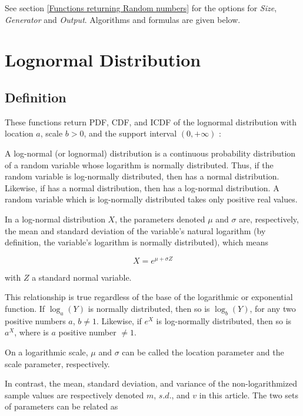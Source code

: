 \vspace{0.3cm}

See section \ref{Functions returning Random numbers} for the options for  {\itshape\sffamily Size},  {\itshape\sffamily Generator} and {\itshape\sffamily Output}. Algorithms and formulas are given below.




\section{Lognormal Distribution}
\label{LognormalDistribution}


\subsection{Definition}
\label{LognormalDistributionDefinition}


These functions return PDF, CDF, and ICDF of the lognormal distribution with location
$a$, scale $b > 0$, and the support interval $(0,+\infty)$ :


A log-normal (or lognormal) distribution is a continuous probability distribution of a random variable whose logarithm is normally distributed. Thus, if the random variable  is log-normally distributed, then  has a normal distribution. Likewise, if  has a normal distribution, then  has a log-normal distribution. A random variable which is log-normally distributed takes only positive real values.

In a log-normal distribution $X$, the parameters denoted $\mu$ and $\sigma$ are, respectively, the mean and standard deviation of the variable's natural logarithm (by definition, the variable's logarithm is normally distributed), which means

\begin{equation}
	X = e^{\mu+\sigma Z}
\end{equation}

with $Z$ a standard normal variable.

This relationship is true regardless of the base of the logarithmic or exponential function. If $\log_a(Y)$ is normally distributed, then so is $\log_b(Y)$, for any two positive numbers $a$, $b \neq 1$. Likewise, if $e^X$ is log-normally distributed, then so is $a^X$, where  is $a$ positive number $\neq 1$.

On a logarithmic scale, $\mu$ and $\sigma$ can be called the location parameter and the scale parameter, respectively.

In contrast, the mean, standard deviation, and variance of the non-logarithmized sample values are respectively denoted $m$, $s.d$., and $v$ in this article. The two sets of parameters can be related as

